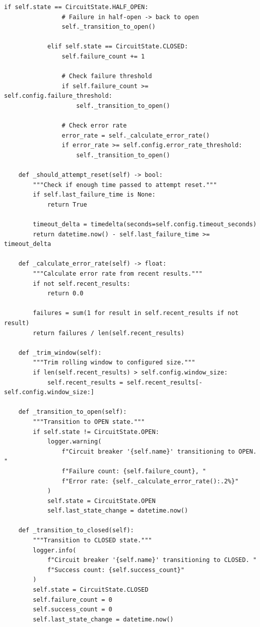 \begin{lstlisting}[style=python, caption={Circuit Breaker Pattern}]
            if self.state == CircuitState.HALF_OPEN:
                # Failure in half-open -> back to open
                self._transition_to_open()

            elif self.state == CircuitState.CLOSED:
                self.failure_count += 1

                # Check failure threshold
                if self.failure_count >= self.config.failure_threshold:
                    self._transition_to_open()

                # Check error rate
                error_rate = self._calculate_error_rate()
                if error_rate >= self.config.error_rate_threshold:
                    self._transition_to_open()

    def _should_attempt_reset(self) -> bool:
        """Check if enough time passed to attempt reset."""
        if self.last_failure_time is None:
            return True

        timeout_delta = timedelta(seconds=self.config.timeout_seconds)
        return datetime.now() - self.last_failure_time >= timeout_delta

    def _calculate_error_rate(self) -> float:
        """Calculate error rate from recent results."""
        if not self.recent_results:
            return 0.0

        failures = sum(1 for result in self.recent_results if not result)
        return failures / len(self.recent_results)

    def _trim_window(self):
        """Trim rolling window to configured size."""
        if len(self.recent_results) > self.config.window_size:
            self.recent_results = self.recent_results[-self.config.window_size:]

    def _transition_to_open(self):
        """Transition to OPEN state."""
        if self.state != CircuitState.OPEN:
            logger.warning(
                f"Circuit breaker '{self.name}' transitioning to OPEN. "
                f"Failure count: {self.failure_count}, "
                f"Error rate: {self._calculate_error_rate():.2%}"
            )
            self.state = CircuitState.OPEN
            self.last_state_change = datetime.now()

    def _transition_to_closed(self):
        """Transition to CLOSED state."""
        logger.info(
            f"Circuit breaker '{self.name}' transitioning to CLOSED. "
            f"Success count: {self.success_count}"
        )
        self.state = CircuitState.CLOSED
        self.failure_count = 0
        self.success_count = 0
        self.last_state_change = datetime.now()


\end{lstlisting}

